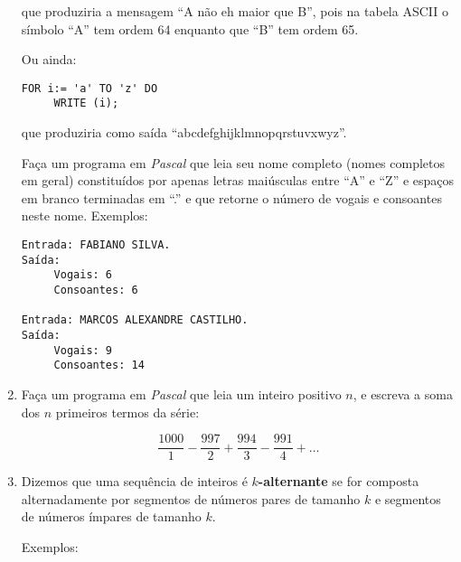 \begin{enumerate}
\vspace*{\baselineskip}

\noindent que  produziria a mensagem ``A não eh maior que B'',
pois na tabela ASCII o símbolo ``A'' tem ordem 64 enquanto que ``B'' tem ordem 65.

Ou ainda:

\vspace*{\baselineskip}

\begin{center}
\begin{minipage}{8cm}
\begin{verbatim}
FOR i:= 'a' TO 'z' DO
     WRITE (i);
\end{verbatim}
\end{minipage}
\end{center}

\vspace*{\baselineskip}

\noindent que produziria como saída ``abcdefghijklmnopqrstuvxwyz''.

Faça um programa em \emph{Pascal} que leia seu nome completo (nomes completos em geral) constituídos
por apenas letras maiúsculas entre ``A'' e ``Z'' e espaços em branco terminadas em ``.'' e que
retorne o número de vogais e consoantes neste nome. Exemplos:

\vspace*{\baselineskip}

\begin{minipage}{8cm}
\begin{verbatim}
Entrada: FABIANO SILVA.
Saída: 
     Vogais: 6
     Consoantes: 6

Entrada: MARCOS ALEXANDRE CASTILHO.
Saída: 
     Vogais: 9
     Consoantes: 14

\end{verbatim}
\end{minipage}

\item Faça um  programa em \emph{Pascal} que leia um inteiro positivo $n$, e escreva
a soma dos $n$ primeiros termos da série:

\[ \frac{1000}{1} - \frac{997}{2} + \frac{994}{3} - \frac{991}{4} + \ldots\]

\item Dizemos que uma sequência de inteiros é {\bf $k$-alternante} se for
composta alternadamente por segmentos de números pares de tamanho $k$ e
segmentos de números ímpares de tamanho $k$.

Exemplos:


\end{enumerate}
